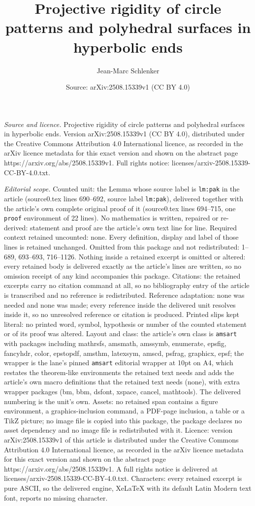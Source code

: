 \documentclass[10pt,a4paper]{amsart}
\title[Projective rigidity of circle patterns and polyhedral surfac]{Projective rigidity of circle patterns and polyhedral surfaces in hyperbolic ends}
\author{Jean-Marc Schlenker}
\date{Source: arXiv:2508.15339v1 (CC BY 4.0)}
\begin{document}
\maketitle

\noindent\emph{Source and licence.} Projective rigidity of circle patterns and polyhedral surfaces in hyperbolic ends. Version arXiv:2508.15339v1 (CC BY 4.0), distributed under the Creative Commons Attribution 4.0 International licence, as recorded in the arXiv licence metadata for this exact version and shown on the abstract page https://arxiv.org/abs/2508.15339v1. Full rights notice: licenses/arxiv-2508.15339-CC-BY-4.0.txt.\par\smallskip

\noindent\textit{Editorial scope.} Counted unit: the Lemma whose source label is \texttt{lm:pak} in the article (source0.tex lines 690--692, source label \texttt{lm:pak}), delivered together with the article's own complete original proof of it (source0.tex lines 694--715, one \texttt{proof} environment of 22 lines). No mathematics is written, repaired or re-derived: statement and proof are the article's own text line for line. Required context retained uncounted: none. Every definition, display and label of those lines is retained unchanged. Omitted from this package and not redistributed: 1--689, 693--693, 716--1126. Nothing inside a retained excerpt is omitted or altered: every retained body is delivered exactly as the article's lines are written, so no omission receipt of any kind accompanies this package. Citations: the retained excerpts carry no citation command at all, so no bibliography entry of the article is transcribed and no reference is redistributed. Reference adaptation: none was needed and none was made; every reference inside the delivered unit resolves inside it, so no unresolved reference or citation is produced. Printed slips kept literal: no printed word, symbol, hypothesis or number of the counted statement or of its proof was altered. Layout and class: the article's own class is \texttt{amsart} with packages including mathrsfs, amsmath, amssymb, enumerate, epsfig, fancyhdr, color, epstopdf, amsthm, latexsym, amscd, psfrag, graphicx, epsf; the wrapper is the lane's pinned \texttt{amsart} editorial wrapper at 10pt on A4, which restates the theorem-like environments the retained text needs and adds the article's own macro definitions that the retained text needs (none), with extra wrapper packages (bm, bbm, dsfont, xspace, cancel, mathtools). The delivered numbering is the unit's own. Assets: no retained span contains a figure environment, a graphics-inclusion command, a PDF-page inclusion, a table or a TikZ picture; no image file is copied into this package, the package declares no asset dependency and no image file is redistributed with it. Licence: version arXiv:2508.15339v1 of this article is distributed under the Creative Commons Attribution 4.0 International licence, as recorded in the arXiv licence metadata for this exact version and shown on the abstract page https://arxiv.org/abs/2508.15339v1. A full rights notice is delivered at licenses/arxiv-2508.15339-CC-BY-4.0.txt. Characters: every retained excerpt is pure ASCII, so the delivered engine, XeLaTeX with its default Latin Modern text font, reports no missing character.
\end{document}
